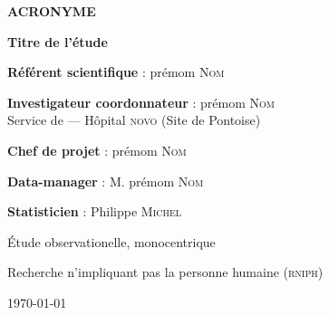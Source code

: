 %
\raggedright
\thispagestyle{empty}

\begin{tcolorbox}[colback=novo!5,
                  colframe=novo]
\begin{center}
\textbf{\textcolor{novo}{\Huge ACRONYME}}
\end{center}
\end{tcolorbox}


\bigskip
\begin{center}
\textbf{\Large Titre de l'étude}
\end{center}


\begin{center}
\begin{minipage}{0.8\textwidth}
\begin{tcolorbox}[colback=novo!5,
                  colframe=novo]

\textbf{Référent scientifique} : \mme prémom \textsc{Nom}
\bigskip

\textbf{Investigateur coordonnateur} : \doc prémom \textsc{Nom}\\
Service de  --- Hôpital \textsc{novo} (Site de Pontoise)

\bigskip

\bigskip

\textbf{Chef de projet} : \mme prémom \textsc{Nom}

\bigskip

\textbf{Data-manager} : M. prémom \textsc{Nom}
\bigskip

\textbf{Statisticien} : \doc Philippe \textsc{Michel}

\end{tcolorbox}
\end{minipage}
\end{center}


Étude observationelle, monocentrique

Recherche n’impliquant pas la personne humaine (\textsc{rniph})


\begin{flushright}
\today
\end{flushright}
